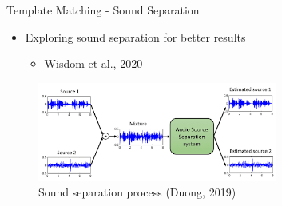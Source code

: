 \begin{frame}{Template Matching - Sound Separation}
    \begin{itemize}
        \item Exploring sound separation for better results
            \begin{itemize}
                \item Wisdom et al., 2020
            \end{itemize}
    \end{itemize}
    \begin{figure}
        \centering
        \includegraphics[height=0.7\textheight,width=0.7\textwidth,keepaspectratio]{images/sound_separation.png}
        \caption{Sound separation process (Duong, 2019)}
    \end{figure}
\end{frame}

